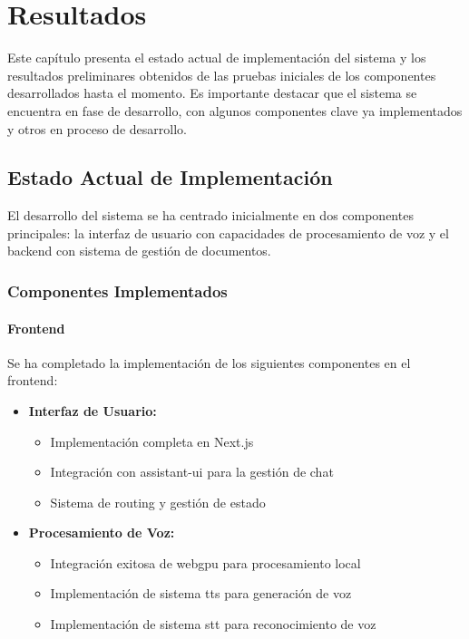 \chapter{Resultados}
\label{resultados}

Este capítulo presenta el estado actual de implementación del sistema y los resultados preliminares obtenidos de las pruebas iniciales de los componentes desarrollados hasta el momento. Es importante destacar que el sistema se encuentra en fase de desarrollo, con algunos componentes clave ya implementados y otros en proceso de desarrollo.

\section{Estado Actual de Implementación}
\label{estado-actual}

El desarrollo del sistema se ha centrado inicialmente en dos componentes principales: la interfaz de usuario con capacidades de procesamiento de voz y el backend con sistema de gestión de documentos.

\subsection{Componentes Implementados}
\label{componentes-implementados}

\subsubsection{Frontend}

Se ha completado la implementación de los siguientes componentes en el frontend:

\begin{itemize}
    \item \textbf{Interfaz de Usuario:}
    \begin{itemize}
        \item Implementación completa en Next.js
        \item Integración con \gls{assistant-ui} para la gestión de chat
        \item Sistema de routing y gestión de estado
    \end{itemize}

    \item \textbf{Procesamiento de Voz:}
    \begin{itemize}
        \item Integración exitosa de \gls{webgpu} para procesamiento local
        \item Implementación de sistema \gls{tts} para generación de voz
        \item Implementación de sistema \gls{stt} para reconocimiento de voz
    \end{itemize}
\end{itemize}


